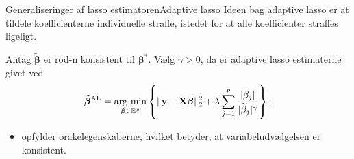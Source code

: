 \begin{frame}{Generaliseringer af lasso estimatoren}{Adaptive lasso}
Ideen bag adaptive lasso er at tildele koefficienterne individuelle straffe, istedet for at alle koefficienter straffes ligeligt.

Antag \(\widetilde{\boldsymbol{\beta}}\) er rod-n konsistent til \(\boldsymbol{\beta}^*\). Vælg \(\gamma >0\), da er adaptive lasso estimaterne givet ved
\begin{align*}
\widehat{\boldsymbol{\beta}}^\text{AL} = \argmin_{\boldsymbol{\beta} \in \R^p} \cbr{ \Vert \mathbf{y} - \mathbf{X} \boldsymbol{\beta} \Vert_2^2 + \lambda \sum_{j=1}^p \frac{ \vert \beta_j \vert}{\vert \widetilde{ \beta}_j \vert^\gamma}}.
\end{align*}
\begin{itemize}
\item opfylder orakelegenskaberne, hvilket betyder, at variabeludvælgelsen er konsistent.
\end{itemize}
\end{frame}

